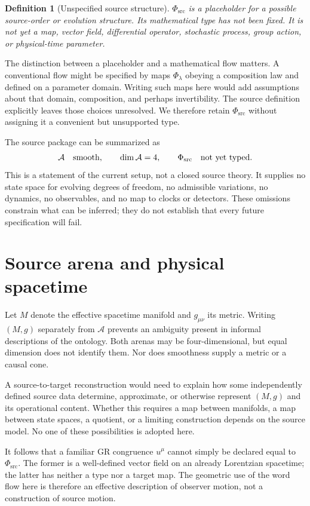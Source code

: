 \documentclass[11pt,oneside]{report}
\newcommand{\Sub}{\mathcal A}
\newcommand{\PhiSrc}{\Phi_{\mathrm{src}}}
\newtheorem{definition}{Definition}
\theoremstyle{remark}
\numberwithin{definition}{chapter}
\numberwithin{proposition}{chapter}
\numberwithin{remark}{chapter}
\begin{document}
\begin{definition}[Unspecified source structure]
$\PhiSrc$ is a placeholder for a possible source-order or evolution structure. Its mathematical type has not been fixed. It is not yet a map, vector field, differential operator, stochastic process, group action, or physical-time parameter.
\end{definition}
The distinction between a placeholder and a mathematical flow matters. A conventional flow might be specified by maps $\Phi_\lambda$ obeying a composition law and defined on a parameter domain. Writing such maps here would add assumptions about that domain, composition, and perhaps invertibility. The source definition explicitly leaves those choices unresolved. We therefore retain $\PhiSrc$ without assigning it a convenient but unsupported type.

The source package can be summarized as
\begin{equation}
\Sub\quad\hbox{smooth},\qquad \dim\Sub=4,\qquad
\PhiSrc\quad\hbox{not yet typed}.
\end{equation}
This is a statement of the current setup, not a closed source theory. It supplies no state space for evolving degrees of freedom, no admissible variations, no dynamics, no observables, and no map to clocks or detectors. These omissions constrain what can be inferred; they do not establish that every future specification will fail.

\section{Source arena and physical spacetime}
Let $M$ denote the effective spacetime manifold and $g_{\mu\nu}$ its metric. Writing $(M,g)$ separately from $\Sub$ prevents an ambiguity present in informal descriptions of the ontology. Both arenas may be four-dimensional, but equal dimension does not identify them. Nor does smoothness supply a metric or a causal cone.

A source-to-target reconstruction would need to explain how some independently defined source data determine, approximate, or otherwise represent $(M,g)$ and its operational content. Whether this requires a map between manifolds, a map between state spaces, a quotient, or a limiting construction depends on the source model. No one of these possibilities is adopted here.

It follows that a familiar GR congruence $u^\mu$ cannot simply be declared equal to $\PhiSrc$. The former is a well-defined vector field on an already Lorentzian spacetime; the latter has neither a type nor a target map. The geometric use of the word flow here is therefore an effective description of observer motion, not a construction of source motion.
\end{document}
